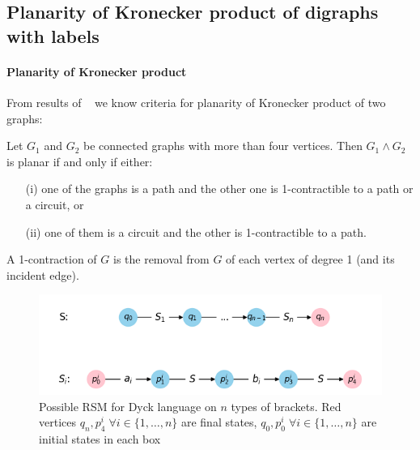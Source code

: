 
\subsection{Planarity of Kronecker product of digraphs with labels}

\paragraph{Planarity of Kronecker product}

From results of ~\cite{farzan1977kronecker} we know criteria for planarity of Kronecker product of two graphs:

\begin{theorem}
\label{theorem:farzan}
Let $G_1$ and $G_2$ be connected graphs with more than four vertices.
Then $G_1 \wedge G_2$ is planar if and only if either:
\begin{enumerate}
	\item[(i)] one of the graphs is a path and the other one is 1-contractible to a path or a circuit, or
	\item[(ii)] one of them is a circuit and the other is 1-contractible to a path.
\end{enumerate}
\end{theorem}

A 1-contraction of $G$ is the removal from $G$ of each vertex of
degree 1 (and its incident edge).


\begin{figure}[h]

  \begin{center}  
  \includegraphics[scale = 0.4]{dyck_n.png}
  \end{center}

  \caption{Possible RSM for Dyck language on $n$ types of brackets. Red vertices $q_n, p^i_4 \; \forall i \in \{1, \ldots, n\}$  are final states, $q_0, p^i_0 \; \forall i \in \{1, \ldots, n\}$ are initial states in each box}

  \label{fig:dyck_n}

\end{figure}

